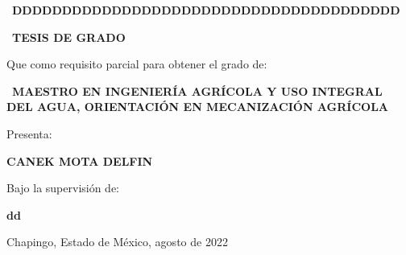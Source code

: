 
\begingroup
\begin{titlepage}

	\begin{minipage}{\textwidth}
		\vspace{5cm}
		\noindent
		\begin{center}
			{\fontsize{14}{16}\ \textbf{DDDDDDDDDDDDDDDDDDDDDDDDDDDDDDDDDDDDDDD} \\[3\baselineskip]}
			
			{\fontsize{14}{16}\ \textbf{TESIS DE GRADO}\\[0.2\baselineskip]}
			
			{Que como requisito parcial para obtener el grado de:\\[0.4\baselineskip]}
			
			{\fontsize{14}{16}\ \textbf{MAESTRO EN INGENIERÍA AGRÍCOLA Y USO INTEGRAL DEL AGUA, ORIENTACIÓN EN MECANIZACIÓN AGRÍCOLA}\\[3\baselineskip]}
			
			{Presenta:\\[0.3\baselineskip]}
			
			{\textbf{CANEK MOTA DELFIN}\\[3\baselineskip]}
			
			{Bajo la supervisión de:\\[0.3\baselineskip]}
			
			{\textbf{dd}\\[8\baselineskip]}
			
			{Chapingo, Estado de México, agosto de 2022 }
			
		\end{center}
		
	\end{minipage}
\end{titlepage}
\endgroup

